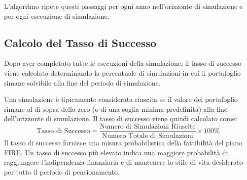     L'algoritmo ripete questi passaggi per ogni anno nell'orizzonte di
    simulazione e per ogni esecuzione di simulazione.

    \subsection{Calcolo del Tasso di
    Successo}\label{subsec:calcolo-del-tasso-di-successo}

Dopo aver completato tutte le esecuzioni della simulazione, il tasso di successo
viene calcolato determinando la percentuale di simulazioni in cui il portafoglio
rimane solvibile alla fine del periodo di simulazione.

    Una simulazione è tipicamente considerata riuscita se il valore del
    portafoglio rimane al di sopra dello zero (o di una soglia minima
    predefinita) alla fine dell'orizzonte di simulazione.
    Il tasso di successo
    viene quindi calcolato come:
    \[
    \text{Tasso di Successo} = \frac{\text{Numero di Simulazioni Riuscite}}{\text{Numero Totale di Simulazioni}} \times 100\%
    \]
    Il tasso di successo fornisce una misura probabilistica della fattibilità
    del piano FIRE. Un tasso di successo più elevato indica una maggiore
    probabilità di raggiungere l'indipendenza finanziaria e di mantenere lo
    stile di vita desiderato per tutto il periodo di pensionamento.